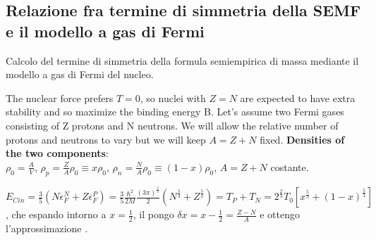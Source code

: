 \documentclass[main.tex]{subfiles}
\begin{document}
\subsection{Relazione fra termine di simmetria della SEMF e il modello a gas di Fermi}
Calcolo del termine di simmetria della formula semiempirica di massa mediante il modello a gas di Fermi del nucleo.


The nuclear force prefers $T = 0$, so nuclei with $Z = N$ are expected to have extra stability and so maximize the binding energy B. Let’s assume two Fermi gases consisting of Z protons and N neutrons. We will allow the relative number of protons and neutrons to vary but we will keep $A = Z + N$ fixed.
\textbf{Densities of the two components}:\\
$\rho_0=\frac{A}{V}$, $\rho_p=\frac{Z}{A}\rho_0\equiv x\rho_0$, $\rho_n=\frac{N}{A}\rho_0\equiv (1-x)\rho_0$, $A=Z+N$ costante.

$E_{Cin}=\frac{3}{5}(N\epsilon_F^N+Z\epsilon_F^P)=\frac{3}{5}\frac{\hbar^2}{2M}\frac{(3\pi)^\frac{2}{3}}{2}(N^{\frac{5}{3}}+Z^{\frac{5}{3}})=T_P+T_N=2^\frac{2}{3}T_0[x^\frac{5}{3}+(1-x)^\frac{5}{3}]$, che espando intorno a $x=\frac{1}{2}$, il pongo $\delta x=x-\frac{1}{2}=\frac{Z-N}{A}$ e ottengo l'approssimazione  .
\end{document}
